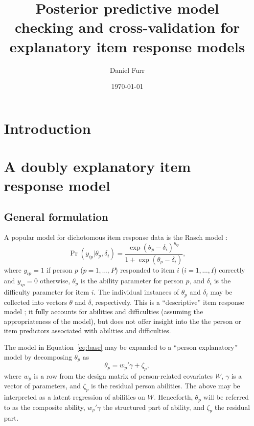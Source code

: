 \documentclass[12pt, letterpaper]{article}
\title{Posterior predictive model checking and cross-validation for explanatory item response models}
\author{Daniel Furr}
\date{\today}
\begin{document}


\newcommand{\comment}[1]{{\footnotesize[\textit{#1}]}}

\maketitle

\tableofcontents
\newpage
{\footnotesize }

\section{Introduction}

\section{A doubly explanatory item response model}

\subsection{General formulation}

A popular model for dichotomous item response data is the Rasch model \parencite{Rasch1960a}:
\begin{equation} \label{eq:base}
	\Pr ( y_{ip} | \theta_p, \delta_i) =
	\frac {\exp(\theta_p - \delta_i)^{y_{ip}}}
	{1 + \exp(\theta_p - \delta_i)}
,\end{equation}
where $y_{ip} = 1$ if person $p$ ($p = 1, \dotsc, P$) responded to item $i$ ($i = 1, \dotsc, I$) correctly and $y_{ip} = 0$ otherwise, $\theta_p$ is the ability parameter for person $p$, and $\delta_i$ is the difficulty parameter for item $i$. The individual instances of $\theta_p$ and $\delta_i$ may be collected into vectors $\theta$ and $\delta$, respectively. This is a ``descriptive'' item response model \parencite{Wilson2004}; it fully accounts for abilities and difficulties (assuming the appropriateness of the model), but does not offer insight into the the person or item predictors associated with abilities and difficulties.

The model in Equation~\ref{eq:base} may be expanded to a ``person explanatory'' model by decomposing $\theta_p$ as
\begin{equation} \label{eq:theta}
	\theta_p = w_p' \gamma + \zeta_p
,\end{equation}
where $w_p$ is a row from the design matrix of person-related covariates $W$, $\gamma$ is a vector of parameters, and $\zeta_p$ is the residual person abilities. The above may be interpreted as a latent regression of abilities on $W$. Henceforth, $\theta_p$ will be referred to as the composite ability, $w_p' \gamma$ the structured part of ability, and $\zeta_p$ the residual part. 
\end{document}

